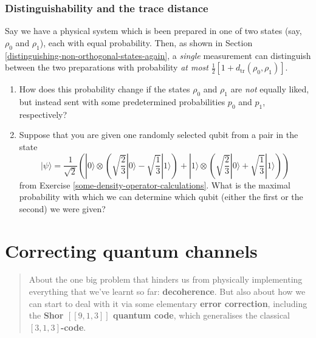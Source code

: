 \documentclass[fleqn,a4paper]{article}
\let\oldsection\section
\renewcommand\section{\clearpage\oldsection}
\theoremstyle{definition}
\theoremstyle{definition}
\theoremstyle{definition}
\theoremstyle{definition}
\theoremstyle{remark}
\begin{document}
\hypertarget{distinguishability-and-trace-distance-exercise}{%
\subsubsection{Distinguishability and the trace distance}\label{distinguishability-and-trace-distance-exercise}}

Say we have a physical system which is been prepared in one of two states (say, \(\rho_0\) and \(\rho_1\)), each with equal probability.
Then, as shown in Section \ref{distinguishing-non-orthogonal-states-again}, a \emph{single} measurement can distinguish between the two preparations with probability \emph{at most} \(\frac{1}{2}[1+d_{\operatorname{tr}}(\rho_0,\rho_1)]\).

\begin{enumerate}
\def\labelenumi{\arabic{enumi}.}
\item
  How does this probability change if the states \(\rho_0\) and \(\rho_1\) are \emph{not} equally liked, but instead sent with some predetermined probabilities \(p_0\) and \(p_1\), respectively?
\item
  Suppose that you are given one randomly selected qubit from a pair in the state
  \[
   |\psi\rangle =
   \frac{1}{\sqrt{2}}\left(
     |0\rangle\otimes\left(
       \sqrt{\frac23}|0\rangle
       - \sqrt{\frac13}|1\rangle
     \right)
     + |1\rangle\otimes\left(
       \sqrt{\frac23}|0\rangle
       + \sqrt{\frac13}|1\rangle
     \right)
   \right)
    \]
  from Exercise \ref{some-density-operator-calculations}.
  What is the maximal probability with which we can determine which qubit (either the first or the second) we were given?
\end{enumerate}

\hypertarget{correcting-quantum-channels}{%
\section{Correcting quantum channels}\label{correcting-quantum-channels}}

\begin{quote}
About the one big problem that hinders us from physically implementing everything that we've learnt so far: \textbf{decoherence}.
But also about how we can start to deal with it via some elementary \textbf{error correction}, including the \textbf{Shor \([[9,1,3]]\) quantum code}, which generalises the classical \textbf{\([3,1,3]\)-code}.
\end{quote}
\end{document}
